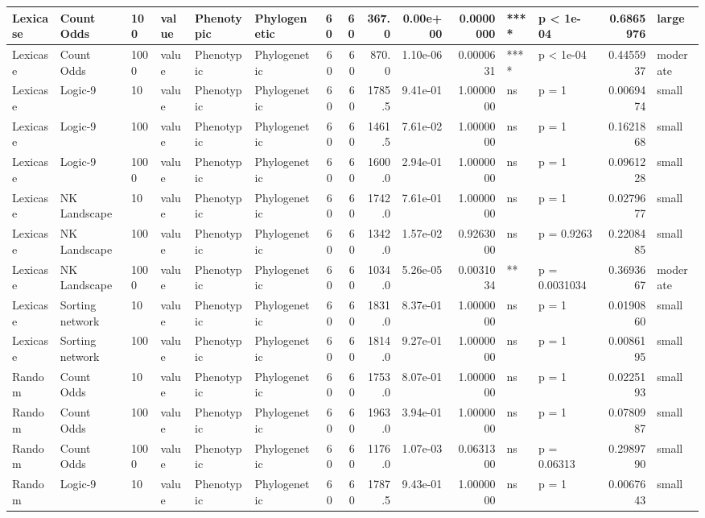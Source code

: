 \documentclass[]{book}
\begin{document}
\begin{table}
\begin{tabular}[t]{l|l|l|l|l|l|r|r|r|r|r|l|l|r|l}
Lexicase & Count Odds & 100 & value & Phenotypic & Phylogenetic & 60 & 60 & 367.0 & 0.00e+00 & 0.0000000 & **** & p < 1e-04 & 0.6865976 & large\\
\hline
Lexicase & Count Odds & 1000 & value & Phenotypic & Phylogenetic & 60 & 60 & 870.0 & 1.10e-06 & 0.0000631 & **** & p < 1e-04 & 0.4455937 & moderate\\
\hline
Lexicase & Logic-9 & 10 & value & Phenotypic & Phylogenetic & 60 & 60 & 1785.5 & 9.41e-01 & 1.0000000 & ns & p = 1 & 0.0069474 & small\\
\hline
Lexicase & Logic-9 & 100 & value & Phenotypic & Phylogenetic & 60 & 60 & 1461.5 & 7.61e-02 & 1.0000000 & ns & p = 1 & 0.1621868 & small\\
\hline
Lexicase & Logic-9 & 1000 & value & Phenotypic & Phylogenetic & 60 & 60 & 1600.0 & 2.94e-01 & 1.0000000 & ns & p = 1 & 0.0961228 & small\\
\hline
Lexicase & NK Landscape & 10 & value & Phenotypic & Phylogenetic & 60 & 60 & 1742.0 & 7.61e-01 & 1.0000000 & ns & p = 1 & 0.0279677 & small\\
\hline
Lexicase & NK Landscape & 100 & value & Phenotypic & Phylogenetic & 60 & 60 & 1342.0 & 1.57e-02 & 0.9263000 & ns & p = 0.9263 & 0.2208485 & small\\
\hline
Lexicase & NK Landscape & 1000 & value & Phenotypic & Phylogenetic & 60 & 60 & 1034.0 & 5.26e-05 & 0.0031034 & ** & p = 0.0031034 & 0.3693667 & moderate\\
\hline
Lexicase & Sorting network & 10 & value & Phenotypic & Phylogenetic & 60 & 60 & 1831.0 & 8.37e-01 & 1.0000000 & ns & p = 1 & 0.0190860 & small\\
\hline
Lexicase & Sorting network & 100 & value & Phenotypic & Phylogenetic & 60 & 60 & 1814.0 & 9.27e-01 & 1.0000000 & ns & p = 1 & 0.0086195 & small\\
\hline
Random & Count Odds & 10 & value & Phenotypic & Phylogenetic & 60 & 60 & 1753.0 & 8.07e-01 & 1.0000000 & ns & p = 1 & 0.0225193 & small\\
\hline
Random & Count Odds & 100 & value & Phenotypic & Phylogenetic & 60 & 60 & 1963.0 & 3.94e-01 & 1.0000000 & ns & p = 1 & 0.0780987 & small\\
\hline
Random & Count Odds & 1000 & value & Phenotypic & Phylogenetic & 60 & 60 & 1176.0 & 1.07e-03 & 0.0631300 & ns & p = 0.06313 & 0.2989790 & small\\
\hline
Random & Logic-9 & 10 & value & Phenotypic & Phylogenetic & 60 & 60 & 1787.5 & 9.43e-01 & 1.0000000 & ns & p = 1 & 0.0067643 & small\\

\end{tabular}
\end{table}
\end{document}

